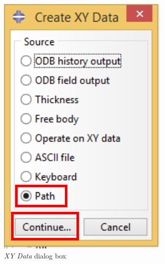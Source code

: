 \begin{itemize}
\begin{figure}[!h]
\begin{subfigure}[!h]{0.35\textwidth}
      \includegraphics[width=\textwidth]{./body/images/post12.pdf}
      \caption{\textit{XY Data} dialog box}
      \label{post12}
    \end{subfigure}%
    \begin{subfigure}[!h]{0.44\textwidth}

\end{subfigure}
\end{figure}
\end{itemize}
